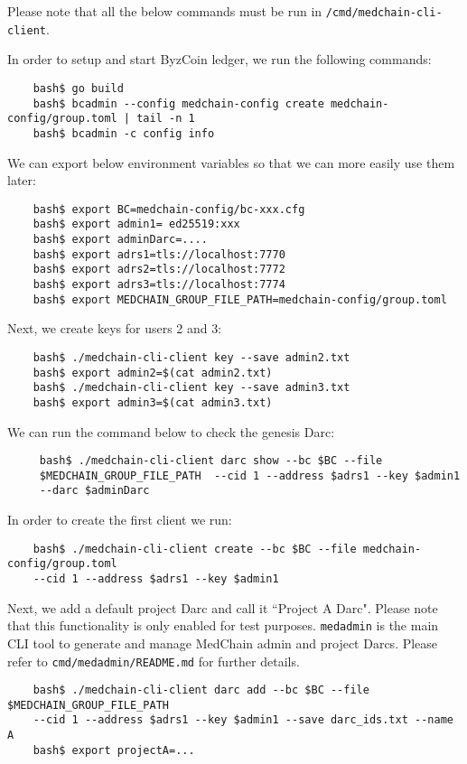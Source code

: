 Please note that all the below commands must be run in \texttt{/cmd/medchain-cli-client}. 

In order to setup and start ByzCoin ledger, we run the following commands:

\begin{verbatim}
    bash$ go build
    bash$ bcadmin --config medchain-config create medchain-config/group.toml | tail -n 1
    bash$ bcadmin -c config info
\end{verbatim}

We can export below environment variables so that we can more easily use them later:

\begin{verbatim}
    bash$ export BC=medchain-config/bc-xxx.cfg
    bash$ export admin1= ed25519:xxx
    bash$ export adminDarc=....
    bash$ export adrs1=tls://localhost:7770
    bash$ export adrs2=tls://localhost:7772
    bash$ export adrs3=tls://localhost:7774
    bash$ export MEDCHAIN_GROUP_FILE_PATH=medchain-config/group.toml
\end{verbatim}

Next, we  create keys for users 2 and 3:

\begin{verbatim}
    bash$ ./medchain-cli-client key --save admin2.txt
    bash$ export admin2=$(cat admin2.txt) 
    bash$ ./medchain-cli-client key --save admin3.txt
    bash$ export admin3=$(cat admin3.txt)
\end{verbatim}

We can run the command below to check the genesis Darc:
\begin{verbatim}
     bash$ ./medchain-cli-client darc show --bc $BC --file
     $MEDCHAIN_GROUP_FILE_PATH  --cid 1 --address $adrs1 --key $admin1 
     --darc $adminDarc
\end{verbatim}

In order to create the first client we run:
\begin{verbatim}
    bash$ ./medchain-cli-client create --bc $BC --file medchain-config/group.toml  
    --cid 1 --address $adrs1 --key $admin1
\end{verbatim}

Next, we add a default project Darc and call it ``Project A Darc". Please note that this functionality is only enabled for test purposes. \texttt{medadmin} is the main CLI tool to generate and manage MedChain admin and project Darcs. Please refer to \texttt{cmd/medadmin/README.md} for further details. 
\begin{verbatim}
    bash$ ./medchain-cli-client darc add --bc $BC --file $MEDCHAIN_GROUP_FILE_PATH  
    --cid 1 --address $adrs1 --key $admin1 --save darc_ids.txt --name A
    bash$ export projectA=...
\end{verbatim}

